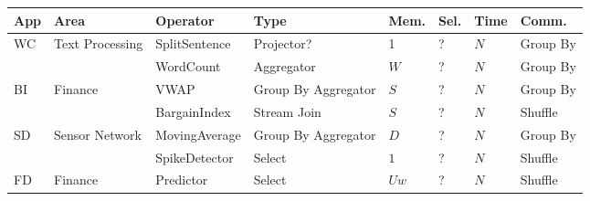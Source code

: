 \documentclass[ppgc,diss,english]{iiufrgs}
\begin{document}
\begin{table}[h]
\begin{center}
	\footnotesize
	\begin{tabular}{ | l | p{2.5cm} | p{2.5cm} | p{2cm} | l | l | l | p{1.5cm} | }
    		\hline
    		\textbf{App} & \textbf{Area} & \textbf{Operator} & \textbf{Type} & \textbf{Mem.} & \textbf{Sel.} & \textbf{Time} & \textbf{Comm.} \\ \hline
    		\multirow{2}{*}{WC} & \multirow{2}{*}{Text Processing} & SplitSentence & Projector? & 1   & ? & $N$ & Group By \\\cline{3-8}
    					        &                                  & WordCount     & Aggregator & $W$ & ? & $N$ & Group By \\\hline
    					                
    					                  
    		\multirow{2}{*}{BI} & \multirow{2}{*}{Finance} & VWAP         & Group By Aggregator & $S$ & ? & $N$ & Group By \\\cline{3-8}
    					        &                          & BargainIndex & Stream Join         & $S$ & ? & $N$ & Shuffle \\\hline
    					                   
    		\multirow{2}{*}{SD} & \multirow{2}{*}{Sensor Network} & MovingAverage  & Group By Aggregator & $D$ & ? & $N$ & Group By \\\cline{3-8}
    					        &                                 & SpikeDetector  & Select              & $1$ & ? & $N$ & Shuffle \\\hline
    					                   
    					                   
    		\multirow{1}{*}{FD} & \multirow{1}{*}{Finance} & Predictor & Select & $Uw$ & ? & $N$ & Shuffle \\\hline
    		

\end{tabular}
\end{center}
\end{table}
\end{document}
